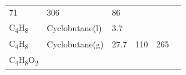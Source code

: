 \documentclass[
  9pt,
]{extbook}
\theoremstyle{definition}
\theoremstyle{definition}
\theoremstyle{definition}
\theoremstyle{remark}
\begin{document}
\begin{longtable}[]{@{}llllll@{}}
\begin{minipage}[t]{0.15\columnwidth}
71\strut
\end{minipage} & \begin{minipage}[t]{0.14\columnwidth}\raggedright
306\strut
\end{minipage} & \begin{minipage}[t]{0.14\columnwidth}\raggedright
86\strut
\end{minipage}\tabularnewline
\begin{minipage}[t]{0.07\columnwidth}\raggedright
C\textsubscript{4}H\textsubscript{8}\strut
\end{minipage} & \begin{minipage}[t]{0.17\columnwidth}\raggedright
Cyclobutane(l)\strut
\end{minipage} & \begin{minipage}[t]{0.15\columnwidth}\raggedright
3.7\strut
\end{minipage} & \begin{minipage}[t]{0.15\columnwidth}\raggedright
\strut
\end{minipage} & \begin{minipage}[t]{0.14\columnwidth}\raggedright
\strut
\end{minipage} & \begin{minipage}[t]{0.14\columnwidth}\raggedright
\strut
\end{minipage}\tabularnewline
\begin{minipage}[t]{0.07\columnwidth}\raggedright
C\textsubscript{4}H\textsubscript{8}\strut
\end{minipage} & \begin{minipage}[t]{0.17\columnwidth}\raggedright
Cyclobutane(g)\strut
\end{minipage} & \begin{minipage}[t]{0.15\columnwidth}\raggedright
27.7\strut
\end{minipage} & \begin{minipage}[t]{0.15\columnwidth}\raggedright
110\strut
\end{minipage} & \begin{minipage}[t]{0.14\columnwidth}\raggedright
265\strut
\end{minipage} & \begin{minipage}[t]{0.14\columnwidth}\raggedright
\strut
\end{minipage}\tabularnewline
\begin{minipage}[t]{0.07\columnwidth}\raggedright
C\textsubscript{4}H\textsubscript{8}O\textsubscript{2}\strut
\end{minipage} & \begin{minipage}[t]{0.17\columnwidth}\raggedright

\end{minipage}
\end{longtable}
\end{document}
